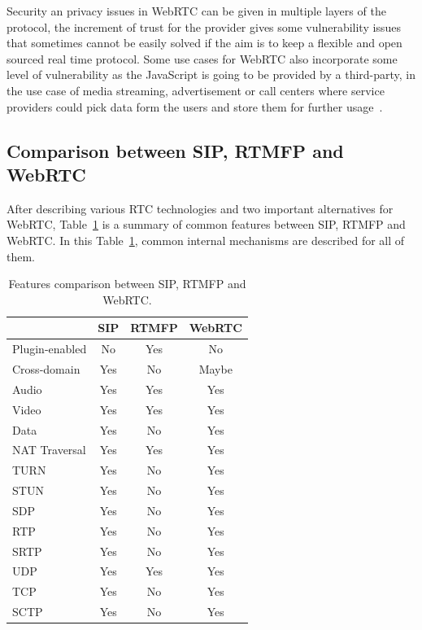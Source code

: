Security an privacy issues in WebRTC can be given in multiple layers of the protocol, the increment of trust for the provider gives some vulnerability issues that sometimes cannot be easily solved if the aim is to keep a flexible and open sourced real time protocol. Some use cases for WebRTC also incorporate some level of vulnerability as the JavaScript is going to be provided by a third-party, in the use case of media streaming, advertisement or call centers where service providers could pick data form the users and store them for further usage~\cite{WebRTCcasesIETF}.

\subsection{Comparison between SIP, RTMFP and WebRTC}

After describing various RTC technologies and two important alternatives for WebRTC, Table~\ref{fig:CompareRTC} is a summary of common features between SIP, RTMFP and WebRTC. In this Table~\ref{fig:CompareRTC}, common internal mechanisms are described for all of them.

\begin{table}[h]
\begin{center}
	\begin{tabular}{| l | c | c | c |}
	\hline
    	 & SIP & RTMFP & WebRTC \\ \hline
    	Plugin-enabled & No &Yes & No \\ \hline
    	Cross-domain & Yes & No & Maybe \\ \hline
    	Audio & Yes & Yes & Yes \\ \hline
    	Video & Yes & Yes & Yes \\ \hline
    	Data & Yes & No & Yes \\ \hline
	NAT Traversal & Yes & Yes & Yes \\ \hline
	\hline \hline
	TURN & Yes & No & Yes \\ \hline
    	STUN & Yes & No & Yes \\ \hline
    	SDP & Yes & No & Yes \\ \hline
    	RTP & Yes & No & Yes \\ \hline
    	SRTP & Yes & No & Yes \\ \hline
    	UDP & Yes & Yes & Yes \\ \hline
    	TCP & Yes & No & Yes \\ \hline
    	SCTP & Yes & No & Yes \\ \hline
	\end{tabular}
      \caption[Features comparison between SIP, RTMFP and WebRTC]{Features comparison between SIP, RTMFP and WebRTC.}
	\label{fig:CompareRTC}
\end{center}
\end{table}

